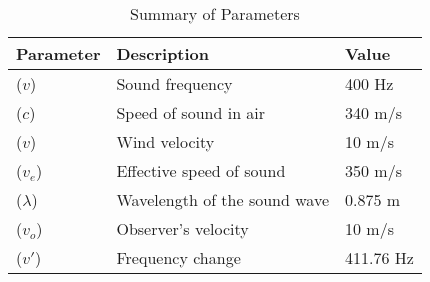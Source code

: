 \documentclass{article}
\begin{document}
\begin{table}[htbp]
  \centering
  \caption{Summary of Parameters}
  \label{tab:parameters}
  \begin{tabularx}{\linewidth}{|X|X|X|}
    \hline
    \textbf{Parameter} & \textbf{Description} & \textbf{Value} \\
    \hline
    ($v$) & Sound frequency & 400 Hz \\
    ($c$) & Speed of sound in air & 340 m/s \\
    ($v$)& Wind velocity & 10 m/s \\
    ($v_e$) & Effective speed of sound & 350 m/s \\
    ($\lambda$) & Wavelength of the sound wave & 0.875 m \\
    ($v_o$) & Observer's velocity & 10 m/s \\
    ($v'$) & Frequency change & 411.76 Hz \\
    \hline
  \end{tabularx}
\end{table}
\end{document}
